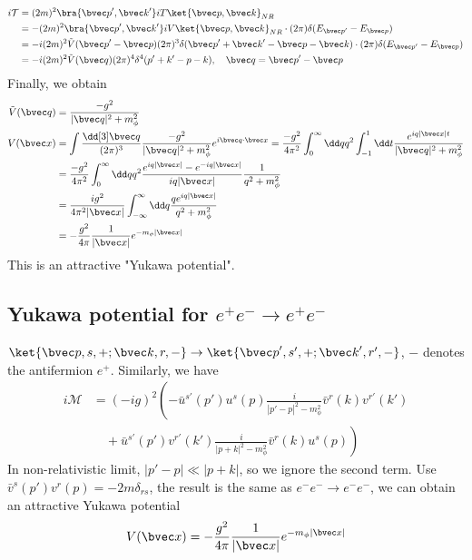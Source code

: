 \begin{equation}
\begin{aligned} 
i\mathcal{T}&=(2m)^2\bra{{\bvec p}',{\bvec k}'}iT\ket{{\bvec p},{\bvec k}}_{NR}\\
& =-(2m)^2\bra{{\bvec p}',{\bvec k}'}iV\ket{{\bvec p},{\bvec k}}_{NR} \cdot (2\pi) \delta(E_{{\bvec p}'}-E_{\bvec p})
\\
& = -i(2m)^2 \tilde{V}({\bvec p}'-{\bvec p})(2\pi)^3 \delta({\bvec p}'+{\bvec k}'-{\bvec p}-{\bvec k})\cdot (2\pi) \delta(E_{{\bvec p}'}-E_{\bvec p})\\
&=-i(2m)^2 \tilde{V}(\bvec q) (2\pi)^4 \delta^4(p'+k'-p-k),\quad \bvec q={\bvec p}'-{\bvec p}
\end{aligned}
\end{equation}
Finally, we obtain
\begin{equation}
\begin{aligned}
\tilde{V}(\bvec q)&=\frac{-g^2}{|\bvec q|^2+m_\phi^2}\\
V({\bvec x})&=\int \frac{\dd[3]\bvec q}{(2\pi)^3} \frac{-g^2}{|\bvec q|^2+m_\phi^2}e^{i\bvec q\cdot {\bvec x}} =\frac{-g^2}{4\pi^2}\int_0^\infty \dd q q^2\int_{-1}^1 \dd t \frac{e^{iq|{\bvec x}|t}}{|\bvec q|^2+m_\phi^2}\\
&= \frac{-g^2}{4\pi^2}\int_0^\infty \dd q q^2\frac{e^{iq|{\bvec x}|}-e^{-iq|{\bvec x}|}}{iq|{\bvec x}|} \frac{1}{q^2+m_\phi^2}\\
&=\frac{ig^2}{4\pi^2|{\bvec x}|}\int_{-\infty}^\infty \dd q \frac{qe^{iq|{\bvec x}|}}{q^2+m_\phi^2}\\
&=-\frac{g^2}{4\pi}\frac{1}{|{\bvec x}|} e^{-m_\phi |{\bvec x}|}
\end{aligned}
\end{equation}
This is an attractive "Yukawa potential".
\subsection{Yukawa potential for $e^+e^-\rightarrow e^+e^-$}
$\ket{{\bvec p},s,+;{\bvec k},r,-}\rightarrow \ket{{\bvec p}',s',+;{\bvec k}',r',-}$, $-$ denotes the antifermion $e^+$. Similarly, we have
\begin{equation}
\begin{aligned}
i\mathcal{M}&=(-ig)^2 \left(
-\bar u^{s'}(p')u^s(p) \frac{i}{|p'-p|^2-m_\phi^2} \bar v^{r}(k) v^{r'}(k')\right.\\
&\left.\quad + \bar u^{s'}(p')v^{r'}(k') \frac{i}{|p+k|^2-m_\phi^2} \bar v^{r}(k) u^s(p)\right)
\end{aligned}
\end{equation}
In non-relativistic limit, $|p'-p|\ll |p+k|$, so we ignore the second term. Use $\bar v^s(p') v^r(p)=-2m \delta_{rs}$, the result is the same as $e^-e^-\rightarrow e^- e^-$, we can obtain an attractive Yukawa potential 
\[
V({\bvec x})=-\frac{g^2}{4\pi}\frac{1}{|{\bvec x}|} e^{-m_\phi |{\bvec x}|}
\]